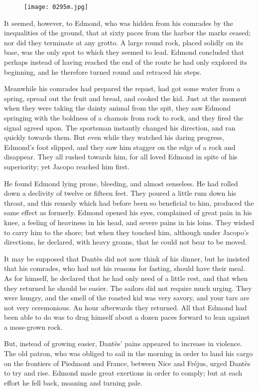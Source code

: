 \begin{figure}[h]
\texttt{[image: 0295m.jpg]}
\end{figure}

It seemed, however, to Edmond, who was hidden from his comrades by the
inequalities of the ground, that at sixty paces from the harbor the
marks ceased; nor did they terminate at any grotto. A large round rock,
placed solidly on its base, was the only spot to which they seemed to
lead. Edmond concluded that perhaps instead of having reached the end
of the route he had only explored its beginning, and he therefore
turned round and retraced his steps.

Meanwhile his comrades had prepared the repast, had got some water from
a spring, spread out the fruit and bread, and cooked the kid. Just at
the moment when they were taking the dainty animal from the spit, they
saw Edmond springing with the boldness of a chamois from rock to rock,
and they fired the signal agreed upon. The sportsman instantly changed
his direction, and ran quickly towards them. But even while they
watched his daring progress, Edmond’s foot slipped, and they saw him
stagger on the edge of a rock and disappear. They all rushed towards
him, for all loved Edmond in spite of his superiority; yet Jacopo
reached him first.

He found Edmond lying prone, bleeding, and almost senseless. He had
rolled down a declivity of twelve or fifteen feet. They poured a little
rum down his throat, and this remedy which had before been so
beneficial to him, produced the same effect as formerly. Edmond opened
his eyes, complained of great pain in his knee, a feeling of heaviness
in his head, and severe pains in his loins. They wished to carry him to
the shore; but when they touched him, although under Jacopo’s
directions, he declared, with heavy groans, that he could not bear to
be moved.

It may be supposed that Dantès did not now think of his dinner, but he
insisted that his comrades, who had not his reasons for fasting, should
have their meal. As for himself, he declared that he had only need of a
little rest, and that when they returned he should be easier. The
sailors did not require much urging. They were hungry, and the smell of
the roasted kid was very savory, and your tars are not very
ceremonious. An hour afterwards they returned. All that Edmond had been
able to do was to drag himself about a dozen paces forward to lean
against a moss-grown rock.

But, instead of growing easier, Dantès’ pains appeared to increase in
violence. The old patron, who was obliged to sail in the morning in
order to land his cargo on the frontiers of Piedmont and France,
between Nice and Fréjus, urged Dantès to try and rise. Edmond made
great exertions in order to comply; but at each effort he fell back,
moaning and turning pale.

